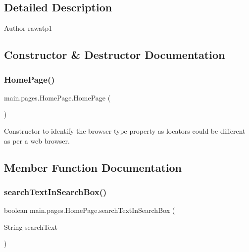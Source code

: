 \subsection{Detailed Description}
\begin{DoxyAuthor}{Author}
rawatp1 
\end{DoxyAuthor}


\subsection{Constructor \& Destructor Documentation}
\mbox{\label{classmain_1_1pages_1_1_home_page_a7fb96c9279ead0bb1905390008df332b}} 
\subsubsection{\texorpdfstring{Home\+Page()}{HomePage()}}
{\footnotesize\ttfamily main.\+pages.\+Home\+Page.\+Home\+Page (\begin{DoxyParamCaption}{ }\end{DoxyParamCaption})}

Constructor to identify the browser type property as locators could be different as per a web browser. 

\subsection{Member Function Documentation}
\mbox{\label{classmain_1_1pages_1_1_home_page_a4ea73ab43b733f85412185481f7cfbe5}} 
\subsubsection{\texorpdfstring{search\+Text\+In\+Search\+Box()}{searchTextInSearchBox()}}
{\footnotesize\ttfamily boolean main.\+pages.\+Home\+Page.\+search\+Text\+In\+Search\+Box (\begin{DoxyParamCaption}\item[{String}]{search\+Text }\end{DoxyParamCaption})}

